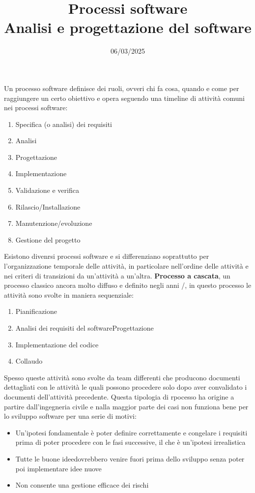 \documentclass{article}
\title{Processi software\\\normalsize Analisi e progettazione del software}
\date{06\textendash11/03/2025}
\begin{document}
\maketitle
Un processo software definisce dei ruoli, ovveri chi fa cosa, quando e come per raggiungere un certo obiettivo e opera seguendo una timeline di attività comuni nei processi software:
\begin{enumerate}
    \item Specifica (o analisi) dei requisiti
    \item Analisi
    \item Progettazione
    \item Implementazione
    \item Validazione e verifica
    \item Rilascio/Installazione
    \item Manutenzione/evoluzione
    \item Gestione del progetto
\end{enumerate}
Esistono divenrsi processi software e si differenziano soprattutto per l'organizzazione temporale delle attività, in particolare nell'ordine delle attività e nei criteri di transizioni da un'attività a un'altra.\acapo
\textbf{Processo a cascata}, un processo classico ancora molto diffuso e definito negli anni /, in questo processo le attività sono svolte in maniera sequenziale:
\begin{enumerate}
    \item Pianificazione
    \item Analisi dei requisiti del softwareProgettazione
    \item Implementazione del codice
    \item Collaudo
\end{enumerate}
Spesso queste attività sono svolte da team differenti che producono documenti dettagliati con le attività le quali possono procedere solo dopo aver convalidato i documenti dell'attività precedente. Questa tipologia di rpocesso ha origine a partire dall'ingegneria civile e nalla maggior parte dei casi non funziona bene per lo sviluppo software per una serie di motivi:
\begin{itemize}
  \item Un'ipotesi fondamentale è poter definire correttamente e congelare i requisiti prima di poter procedere con le fasi successive, il che è un'ipotesi irrealistica
  \item Tutte le \vopen buone idee\vclosespace dovrebbero venire fuori prima dello sviluppo senza poter poi implementare idee nuove
  \item Non consente una gestione efficace dei rischi
\end{itemize}
\end{document}
